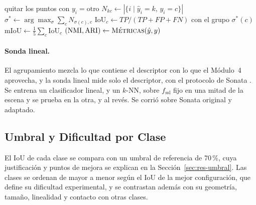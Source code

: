 \begin{algorithm}[!htbp]
\small
\caption{Evaluación de un agrupamiento con etiquetas.}
\label{alg:evaluacion}
quitar los puntos con $y_i=\text{otro}$\;
$N_{kc} \leftarrow |\{i \mid \hat y_i=k,\, y_i=c\}|$ \quad $\sigma^{*} \leftarrow \arg\max_\sigma \sum_c N_{\sigma(c),c}$ 
$\mathrm{IoU}_c \leftarrow TP/(TP+FP+FN)$ con el grupo $\sigma^{*}(c)$ \quad $\mathrm{mIoU} \leftarrow \frac{1}{5}\sum_c \mathrm{IoU}_c$\;
$(\mathrm{NMI}, \mathrm{ARI}) \leftarrow \textsc{Métricas}(\hat y, y)$\;
\end{algorithm}

\paragraph*{Sonda lineal.} El agrupamiento mezcla lo que contiene el descriptor
con lo que el Módulo~4 aprovecha, y la sonda lineal mide solo el descriptor, con el
protocolo de Sonata \cite{wu2025sonata}. Se entrena un clasificador lineal, y un
$k$-NN, sobre $f_{\mathrm{ssl}}$ fijo en una mitad de la escena y se prueba en la
otra, y al revés. Se corrió sobre Sonata original y adaptado.

\subsection{Umbral y Dificultad por Clase}
\label{sec:umbral-dificultad}

El IoU de cada clase se compara con un umbral de referencia de 70\,\%, cuya
justificación y puntos de mejora se explican en la
Sección~\ref{sec:res-umbral}. Las clases se ordenan de mayor a menor según el
IoU de la mejor configuración, que define su dificultad experimental, y se
contrastan además con su geometría, tamaño, linealidad y contacto con otras
clases.

